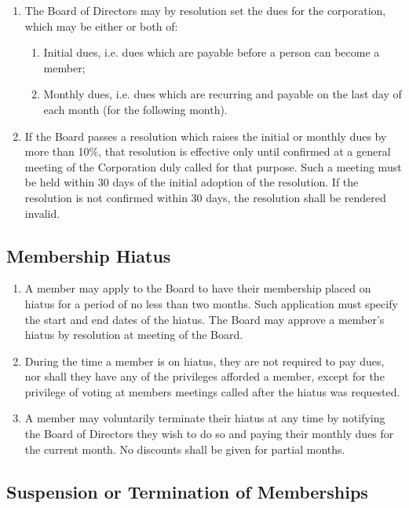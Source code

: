 \documentclass{article}
\begin{document}
\begin{enumerate}
\item The Board of Directors may by resolution set the dues for the corporation, which may be either or both of:
	\begin{enumerate}
	\item Initial dues, i.e. dues which are payable before a person can become a member;
	\item Monthly dues, i.e. dues which are recurring and payable on the last day of each month (for the following month).
	\end{enumerate}
\item If the Board passes a resolution which raises the initial or monthly dues by more than 10\%, that resolution is effective only until confirmed at a general meeting of the Corporation duly called for that purpose. Such a meeting must be held within 30 days of the initial adoption of the resolution. If the resolution is not confirmed within 30 days, the resolution shall be rendered invalid.
\end{enumerate}

\subsection{Membership Hiatus}

\begin{enumerate}
\item A member may apply to the Board to have their membership placed on hiatus for a period of no less than two months. Such application must specify the start and end dates of the hiatus. The Board may approve a member’s hiatus by resolution at meeting of the Board.
\item During the time a member is on hiatus, they are not required to pay dues, nor shall they have any of the privileges afforded a member, except for the privilege of voting at members meetings called after the hiatus was requested.
\item A member may voluntarily terminate their hiatus at any time by notifying the Board of Directors they wish to do so and paying their monthly dues for the current month. No discounts shall be given for partial months.
\end{enumerate}

\subsection{Suspension or Termination of Memberships}
\end{document}
